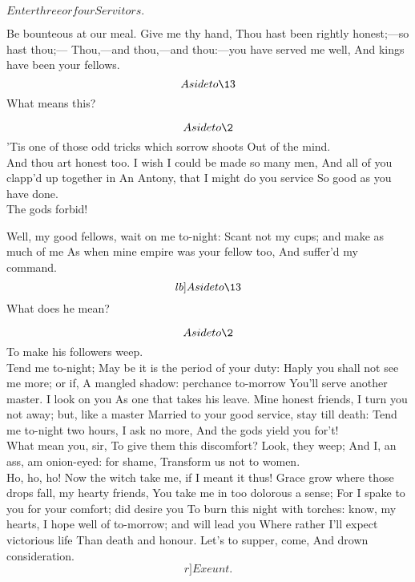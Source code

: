 \documentclass{book}
\begin{document}
	\(Enter three or four Servitors.\)

	Be bounteous at our meal. Give me thy hand,
	Thou hast been rightly honest;---so hast thou;---
	Thou,---and thou,---and thou:---you have served me well,
	And kings have been your fellows. \\

\2	\[Aside to \13\]  What means this?

	\[Aside to \2\]  'Tis one of those odd tricks which sorrow shoots
	Out of the mind. \\

\1	                  And thou art honest too.
	I wish I could be made so many men,
	And all of you clapp'd up together in
	An Antony, that I might do you service
	So good as you have done. \\

	The gods forbid!

\1	Well, my good fellows, wait on me to-night:
	Scant not my cups; and make as much of me
	As when mine empire was your fellow too,
	And suffer'd my command. \\

\2 \relax \[lb]Aside to \13\]  What does he mean?

	\[Aside to \2\]  To make his followers weep. \\

\1	Tend me to-night;
	May be it is the period of your duty:
	Haply you shall not see me more; or if,
	A mangled shadow: perchance to-morrow
	You'll serve another master. I look on you
	As one that takes his leave. Mine honest friends,
	I turn you not away; but, like a master
	Married to your good service, stay till death:
	Tend me to-night two hours, I ask no more,
	And the gods yield you for't! \\

	What mean you, sir,
	To give them this discomfort? Look, they weep;
	And I, an ass, am onion-eyed: for shame,
	Transform us not to women. \\

\1	Ho, ho, ho!
	Now the witch take me, if I meant it thus!
	Grace grow where those drops fall, my hearty friends,
	You take me in too dolorous a sense;
	For I spake to you for your comfort; did desire you
	To burn this night with torches: know, my hearts,
	I hope well of to-morrow; and will lead you
	Where rather I'll expect victorious life
	Than death and honour. Let's to supper, come,
	And drown consideration. \[r]Exeunt.\]


\end{document}
